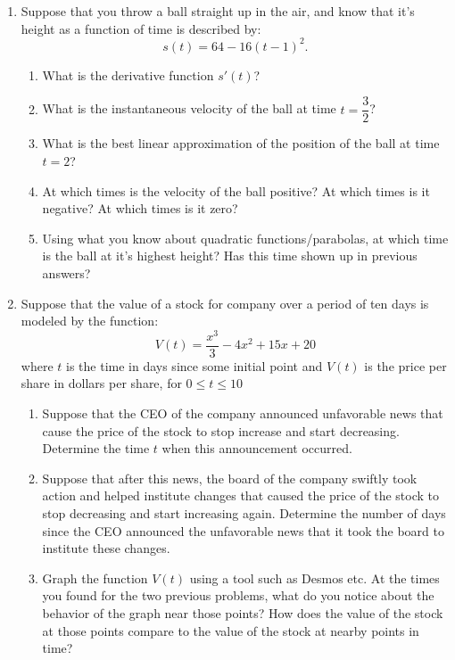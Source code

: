 \documentclass[12pt]{exam}
\begin{document}
\begin{enumerate}
  \item Suppose that you throw a ball straight up in the air,
    and know that it's height as a function of time is described by:
    \begin{equation}
      s(t) = 64 - 16(t - 1)^2.
    \end{equation}
    \begin{enumerate}
      \item What is the derivative function $s'(t)$?
        \vfill

      \item What is the instantaneous velocity of the ball at time $t = \dfrac{3}{2}$?
        \vfill

      \item What is the best linear approximation of the position of the ball at time $t = 2$?
        \vfill

      \newpage
      \item At which times is the velocity of the ball positive? At which times is it negative? At which times is it zero?
        \vfill

      \item Using what you know about quadratic functions/parabolas, at which time is the ball at it's highest height? Has this time shown up in previous answers?
        \vfill
        \newpage
    \end{enumerate}

  \item Suppose that the value of a stock for company over a period of ten days is modeled by the function: 
    \begin{equation}
      V(t) = \dfrac{x^3}{3} - 4x^2 + 15 x + 20
    \end{equation}
    where $t$ is the time in days since some initial point
    and $V(t)$ is the price per share in dollars per share,
    for $0 \leq t \leq 10$
  \begin{enumerate}
  \item Suppose that the CEO of the company announced unfavorable news that
    cause the price of the stock to stop increase and start decreasing. Determine the time $t$ when this announcement occurred.
    \vfill

  \item Suppose that after this news, the board of the company swiftly took action and helped institute changes that caused the price of the stock to stop decreasing and start increasing again. Determine the number of days since the CEO announced the unfavorable news that it took the board to institute these changes.
    \vfill

  \item Graph the function $V(t)$ using a tool such as Desmos etc. 
    At the times you found for the two previous problems,
    what do you notice about the behavior of the graph near those points?
    How does the value of the stock at those points compare to the value of the stock at nearby points in time?
    \vfill
  \end{enumerate}
\end{enumerate}
\end{document}
